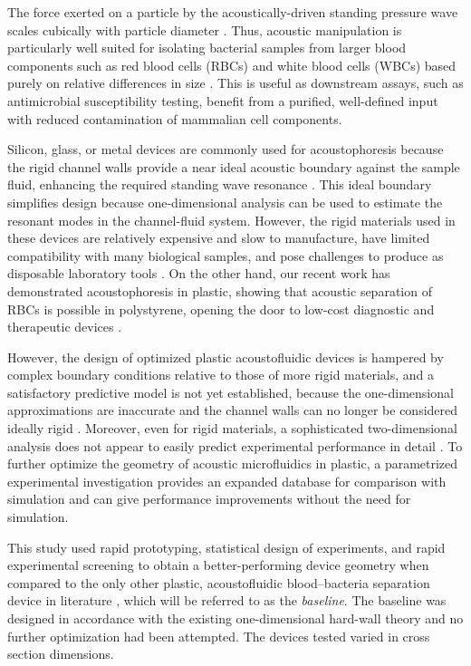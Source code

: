 The force exerted on a particle by the acoustically-driven standing pressure wave scales cubically with particle diameter \cite{settnes2012forces}. Thus, acoustic manipulation is particularly well suited for isolating bacterial samples from larger blood components such as red blood cells (RBCs) and white blood cells (WBCs) based purely on relative differences in size \cite{ohlsson2016integrated}\cite{li2016acoustofluidic}. This is useful as downstream assays, such as antimicrobial susceptibility testing, benefit from a purified, well-defined input with reduced contamination of mammalian cell components.

Silicon, glass, or metal devices are commonly used for acoustophoresis because the rigid channel walls provide a near ideal acoustic boundary against the sample fluid, enhancing the required standing wave resonance \cite{barnkob2009acoustofluidics}\cite{hill2008modelling}. This ideal boundary simplifies design because one-dimensional analysis can be used to estimate the resonant modes in the channel-fluid system. However, the rigid materials used in these devices are relatively expensive and slow to manufacture, have limited compatibility with many biological samples, and pose challenges to produce as disposable laboratory tools \cite{nge2013advances}.  On the other hand, our recent work has demonstrated acoustophoresis in plastic, showing that acoustic separation of RBCs is possible in polystyrene, opening the door to low-cost diagnostic and therapeutic devices \cite{mueller2013continuous}.


However, the design of optimized plastic acoustofluidic devices is hampered by complex boundary conditions relative to those of more rigid materials, and a satisfactory predictive model is not yet established, because the one-dimensional approximations are inaccurate and the channel walls can no longer be considered ideally rigid \cite{mueller2013continuous}.  Moreover, even for rigid materials, a sophisticated two-dimensional analysis does not appear to easily predict experimental performance in detail \cite{garofalo2016performance}\cite{bora2015efficient}. To further optimize the geometry of acoustic microfluidics in plastic, a parametrized experimental investigation provides an expanded database for comparison with simulation and can give performance improvements without the need for simulation.  

This study used rapid prototyping, statistical design of experiments, and rapid experimental screening to obtain a better-performing device geometry when compared to the only other plastic, acoustofluidic blood--bacteria separation device in literature \cite{mueller2013continuous}, which will be referred to as the \textit{baseline}. The baseline was designed in accordance with the existing one-dimensional hard-wall theory and no further optimization had been attempted. The devices tested varied in cross section dimensions. 

